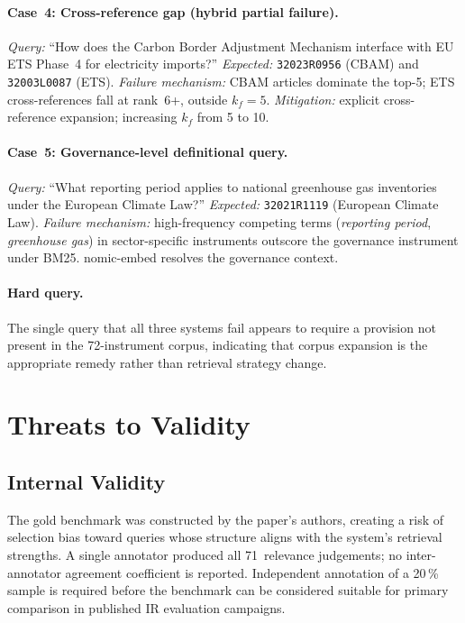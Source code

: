 \documentclass[sigconf,screen]{acmart}
\newcommand{\nomicshort}{nomic-embed\xspace}
\begin{document}
\paragraph{Case~4: Cross-reference gap (hybrid partial failure).}
\textit{Query:} ``How does the Carbon Border Adjustment Mechanism
interface with EU ETS Phase~4 for electricity imports?''
\textit{Expected:} \texttt{32023R0956} (CBAM) and
\texttt{32003L0087} (ETS).
\textit{Failure mechanism:} CBAM articles dominate the top-5;
ETS cross-references fall at rank~6+, outside $k_f{=}5$.
\textit{Mitigation:} explicit cross-reference expansion; increasing
$k_f$ from 5 to 10.

\paragraph{Case~5: Governance-level definitional query.}
\textit{Query:} ``What reporting period applies to national
greenhouse gas inventories under the European Climate Law?''
\textit{Expected:} \texttt{32021R1119} (European Climate Law).
\textit{Failure mechanism:} high-frequency competing terms
(\textit{reporting period}, \textit{greenhouse gas}) in
sector-specific instruments outscore the governance instrument
under BM25.  \nomicshort resolves the governance context.

\paragraph{Hard query.}
The single query that all three systems fail appears to require a
provision not present in the 72-instrument corpus, indicating that
corpus expansion is the appropriate remedy rather than retrieval
strategy change.

\section{Threats to Validity}
\label{sec:validity}

\subsection{Internal Validity}
\label{sec:validity-internal}

The gold benchmark was constructed by the paper's authors, creating a
risk of selection bias toward queries whose structure aligns with the
system's retrieval strengths.  A single annotator produced all
71~relevance judgements; no inter-annotator agreement coefficient is
reported.  Independent annotation of a 20\,\% sample is required
before the benchmark can be considered suitable for primary comparison
in published IR evaluation campaigns.
\end{document}
